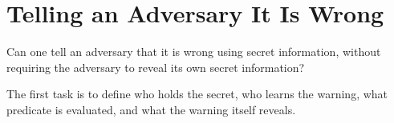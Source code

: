 \chapter{Telling an Adversary It Is Wrong}
\label{chap:telling-adversary-wrong}


Can one tell an adversary that it is wrong using secret information, without
requiring the adversary to reveal its own secret information?

The first task is to define who holds the secret, who learns the warning, what
predicate is evaluated, and what the warning itself reveals.
